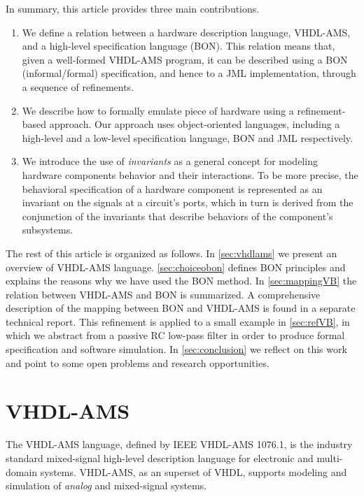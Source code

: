 \documentclass{article}
\begin{document}
In summary, this article provides three main contributions.
\begin{enumerate}
\item We define a relation between a hardware description language,
  VHDL-AMS, and a high-level specification language (BON).  This
  relation means that, given a well-formed VHDL-AMS program, it can be
  described using a BON (informal/formal) specification, and hence to
  a JML implementation, through a sequence of refinements.
\item We describe how to formally emulate piece of hardware using a
  refinement-based approach.  Our approach uses object-oriented
  languages, including a high-level and a low-level specification
  language, BON and JML respectively.
\item We introduce the use of \emph{invariants} as a general concept
  for modeling hardware components behavior and their interactions.
  To be more precise, the behavioral specification of a hardware
  component is represented as an invariant on the signals at a
  circuit's ports, which in turn is derived from the conjunction of
  the invariants that describe behaviors of the component's
  subsystems.
\end{enumerate} 

The rest of this article is organized as follows.  In
\autoref{sec:vhdlams} we present an overview of VHDL-AMS language.
\autoref{sec:choiceobon} defines BON principles and explains the
reasons why we have used the BON method.  In \autoref{sec:mappingVB}
the relation between VHDL-AMS and BON is summarized.  A comprehensive
description of the mapping between BON and VHDL-AMS is found in a
separate technical report.  This refinement is applied to a small
example in \autoref{sec:refVB}, in which we abstract from a passive RC
low-pass filter in order to produce formal specification and software
simulation.  In \autoref{sec:conclusion} we reflect on this work and
point to some open problems and research opportunities.
 
\section{VHDL-AMS}
\label{sec:vhdlams} 

The VHDL-AMS language, defined by IEEE VHDL-AMS 1076.1, is the
industry standard mixed-signal high-level description language for
electronic and multi-domain systems.  VHDL-AMS, as an superset of
VHDL, supports modeling and simulation of \emph{analog} and
mixed-signal systems.  
\end{document}
